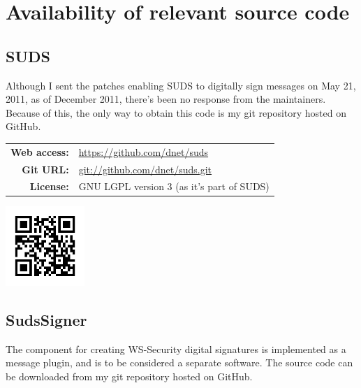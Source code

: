 \section{Availability of relevant source code}

\subsection{SUDS}

Although I sent the patches enabling SUDS to digitally sign messages on May 21, 2011, as of December 2011, there's been no response from the maintainers. Because of this, the only way to obtain this code is my git repository hosted on GitHub.

\bigskip

\begin{center}
 \begin{minipage}[c]{0.7\linewidth}
  \begin{tabular}{rl}
   \textbf{Web access:} & \url{https://github.com/dnet/suds} \\
   \textbf{Git URL:} & \url{git://github.com/dnet/suds.git} \\
   \textbf{License:} & GNU LGPL version 3 (as it's part of SUDS)
  \end{tabular}
 \end{minipage}
 \hspace{5mm}
 \begin{minipage}[c]{3cm}
  \includegraphics[width=3cm]{images/qr/suds.png}
 \end{minipage}
\end{center}

\subsection{SudsSigner}

The component for creating WS\hyp{}Security digital signatures is implemented as a message plugin, and is to be considered a separate software. The source code can be downloaded from my git repository hosted on GitHub.

\bigskip

